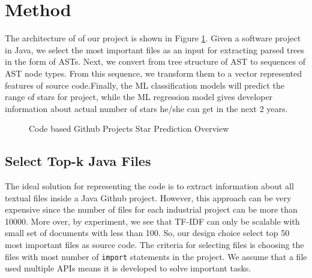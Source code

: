 \section{Method}
The architecture of of our project is shown in Figure \ref{fig:mapping_expression}. Given a software project in Java, we select the most important files as an input for extracting parsed trees in the form of ASTs. Next, we convert from tree structure of AST to sequences of AST node types. From this sequence, we transform them to a vector represented features of source code.Finally, the ML classification models will predict the range of stars for project, while the ML regression model gives developer information about actual number of stars he/she can get in the next 2 years.

\begin{figure}
        \caption{Code based Github Projects Star Prediction Overview}
        \label{fig:mapping_expression} 
\end{figure}
\subsection{Select Top-k Java Files}
The ideal solution for representing the code is to extract information about all textual files inside a Java Github project. However, this approach can be very expensive since the number of files for each industrial project can be more than 10000. More over, by experiment, we see that TF-IDF can only be scalable with small set of documents with less than 100. So, our design choice select top 50 most important files as source code. The criteria for selecting files is choosing the files with most number of \texttt{import} statements in the project. We assume that a file used multiple APIs means it is developed to solve important tasks.

